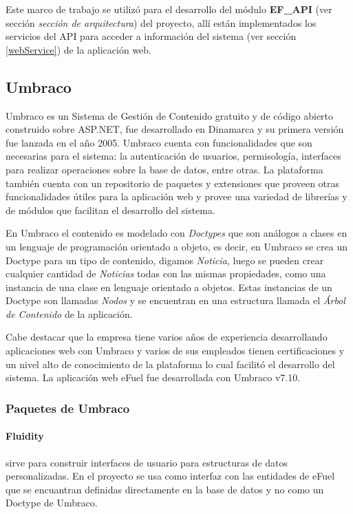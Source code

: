     Este marco de trabajo se utilizó para el desarrollo del módulo \textbf{EF\_API} (ver sección \emph{sección de arquitectura}) del proyecto, allí están implementados los servicios del API para acceder a información del sistema (ver sección \ref{webService}) de la aplicación web.

    \subsection{Umbraco}
    Umbraco es un Sistema de Gestión de Contenido gratuito y de código abierto construido sobre ASP.NET, fue desarrollado en Dinamarca y su primera versión fue lanzada en el año 2005. Umbraco cuenta con funcionalidades que son necesarias para el sistema: la autenticación de usuarios, permisología, interfaces para realizar operaciones sobre la base de datos, entre otras. La plataforma también cuenta con un repositorio de paquetes y extensiones que proveen otras funcionalidades útiles para la aplicación web y provee una variedad de librerías y de módulos que facilitan el desarrollo del sistema.

    En Umbraco el contenido es modelado con \emph{Doctypes} que son análogos a clases en un lenguaje de programación orientado a objeto, es decir, en Umbraco se crea un Doctype para un tipo de contenido, digamos \emph{Noticia}, luego se pueden crear cualquier cantidad de \emph{Noticias} todas con las mismas propiedades, como una instancia de una clase en lenguaje orientado a objetos. Estas instancias de un Doctype son llamadas \emph{Nodos} y se encuentran en una estructura llamada el \emph{Árbol de Contenido} de la aplicación.

    Cabe destacar que la empresa tiene varios años de experiencia desarrollando aplicaciones web con Umbraco y varios de sus empleados tienen certificaciones y un nivel alto de conocimiento de la plataforma lo cual facilitó el desarrollo del sistema. La aplicación web eFuel fue desarrollada con Umbraco v7.10.

    \subsubsection{Paquetes de Umbraco}
    \paragraph{Fluidity} sirve para construir interfaces de usuario para estructuras de datos personalizadas. En el proyecto se usa como interfaz con las entidades de eFuel que se encuantran definidas directamente en la base de datos y no como un Doctype de Umbraco.
